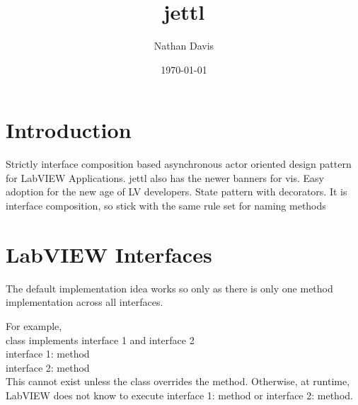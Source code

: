 \documentclass{article}
\title{jettl}
\author{Nathan Davis}
\date{\today}
\begin{document}
\section{Introduction}
\label{sec:introduction}

Strictly interface composition based asynchronous actor oriented design pattern for LabVIEW Applications.
jettl also has the newer banners for vis. Easy adoption for the new age of LV developers.
State pattern with decorators.
It is interface composition, so stick with the same rule set for naming methods

\section{LabVIEW Interfaces}
\label{sec:labview-interfaces}

The default implementation idea works so only as there is only one method implementation across all interfaces.

For example, \\
class implements interface 1 and interface 2 \\
interface 1: method \\
interface 2: method \\
This cannot exist unless the class overrides the method.
Otherwise, at runtime, LabVIEW does not know to execute interface 1: method or interface 2: method.
\end{document}

